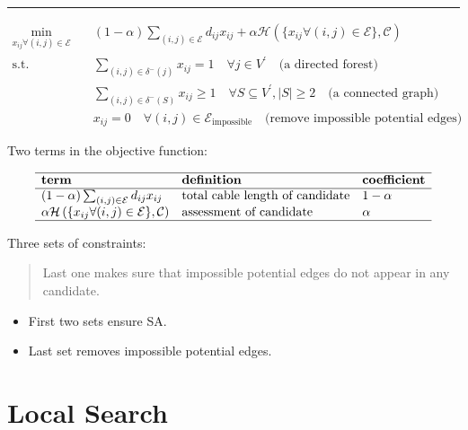 \documentclass[
]{book}
\providecommand{\tightlist}{%
  \setlength{\itemsep}{0pt}\setlength{\parskip}{0pt}}
\begin{document}
\begin{center}\rule{0.5\linewidth}{0.5pt}\end{center}

\[
\begin{aligned}
  \min_{x_{i j} \forall (i, j) \in \mathcal{E}} \quad
    & (1 - \alpha) \sum_{(i, j) \in \mathcal{E}} d_{i j} x_{i j}
    + \alpha \mathcal{H}
    \left(\{x_{i j} \forall (i, j) \in \mathcal{E} \}, \mathcal{C} \right) \\
  \text{s.t.} \quad & \sum_{(i, j) \in \delta^{-}(j)} x_{i j} = 1
    \quad \forall j \in V^{\prime}
    \quad \text{(a directed forest)} \\
  & \sum_{(i, j) \in \delta^{-}(S)} x_{i j} \geq 1
    \quad \forall S \subseteq V^{\prime},|S| \geq 2
    \quad \text{(a connected graph)} \\
  & x_{i j} = 0
    \quad \forall (i, j) \in \mathcal{E}_\text{impossible}
    \quad \text{(remove impossible potential edges)}
\end{aligned}
\]

Two terms in the objective function:

\[
\begin{array}{lll}
  \hline
  \textbf{term} & \textbf{definition} & \textbf{coefficient} \\
  \hline
  (1 - \alpha) \sum_{(i, j) \in \mathcal{E}} d_{i j} x_{i j}
  & \text{total cable length of candidate}
  & 1 - \alpha \\
  \alpha \mathcal{H}
  \left(\{x_{i j} \forall (i, j) \in \mathcal{E} \}, \mathcal{C} \right)
  & \text{assessment of candidate}
  & \alpha \\
  \hline
\end{array}
\]

Three sets of constraints:

\begin{quote}
Last one makes sure that impossible potential edges do not appear in any
candidate.
\end{quote}

\begin{itemize}
\tightlist
\item
  First two sets ensure SA. \citep{fischetti1997branch}
\item
  Last set removes impossible potential edges.
\end{itemize}

\hypertarget{combinatorial}{%
\section{Local Search}\label{combinatorial}}
\end{document}
